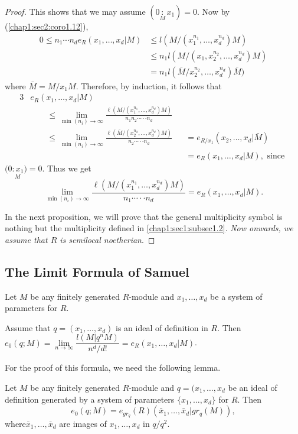 \begin{proof}
This shows that we may assume $(0 \underset {M}:x_1)=0$. Now by
(\ref{chap1:sec2:coro1.12}),  
\begin{align*}
  0 \leq n_1 \cdots n_d e_R(x_1, \ldots,  x_d|M) & \le l(M/(x^{n_1}_1,
  \ldots,  x^{n_d}_d)M)\\ 
  & \leq n_1 l(M/(x_1, x^{n_2}_2, \ldots,  x^{n_d}_d)M)\\
  &=n_1 l(\bar M/x^{n_2}_2, \ldots,  x^{n_d}_d)\bar M)
\end{align*}
where $\bar M = M/x_1 M$. Therefore, by induction, it follows that 
\begin{alignat*}{3}
  &e_R(x_1, \ldots, x_d|M)\\ 
  & \qquad\leq \lim_{\min (n_i)\to \infty}
  \frac{\ell(M/(x_1^{n_1}, \ldots, x_d^{n_d} )M )}{n_1 n_2
    \cdots\cdot\cdot n_d}\\ 
  & \qquad \leq \lim_{\min (n_i)\to \infty}  \frac{\ell(\bar {M}/(x_2^{n_2},
    \ldots, x^{n_d}_d)M)}{n_2 \cdots\cdot\cdot n_d}& &=e_{R/x_1}(x_2,
  \ldots, x_d|\bar{M})\\ 
  &\qquad  &&= e_R(x_1, \ldots,  x_d| M), \text{ since }
\end{alignat*}\pageoriginale
$(\underset {M}{0:x_1)}=0$. Thus we get 
$$
\lim_{\min (n_i)\to \infty}  \frac{\ell(M/(x^{n_1}_1, \ldots,
  x^{n_d}_d)M)}{n_1\cdots \cdot\cdot n_d}=e_R(x_1, \ldots, x_d| M). 
$$ 

In the next proposition, we will prove that the general multiplicity
symbol is nothing but the multiplicity defined in
\ref{chap1:sec1:subsec1.2}. \textit{Now 
  onwards, we assume that $R$ is semilocal noetherian}.  
\end{proof}

\subsection{The Limit Formula of Samuel}\label{chap1:sec2:subsec1.17} 
Let $M$ be any finitely generated $R$-module and $x_1, \ldots,
  x_d$ be a system of parameters for $R$.  

Assume that $q=(x_1, \ldots, x_d)$ is an ideal of definition
  in $R$. Then $e_0(q;M)=\lim\limits_{n\to \infty}
\dfrac{l(M|q^nM)}{n^d/d!}=e_R(x_1, \ldots, x_d |M)$.  

For the proof of this formula, we need the following lemma. 

\setcounter{lemma}{17}
\begin{lemma}\label{chap1:sec2:lem1.18}
  Let $M$ be any finitely generated $R$-module and $q=(x_1,
  \ldots, x_d$ be an ideal of definition generated by a system of parameters
  $\{ x_1, \ldots, x_d\}$ for $R$. Then 
  $$
  e_0(q;M)=e_{gr_q}(R)(\bar{x}_1, \ldots, \bar{x}_d|gr_q(M)), 
  $$
  where\pageoriginale $ \bar{x}_1, \ldots, \bar{x}_d$ are images of
  $x_1, \ldots,  x_d$ in $q/q^2$. 
\end{lemma}

